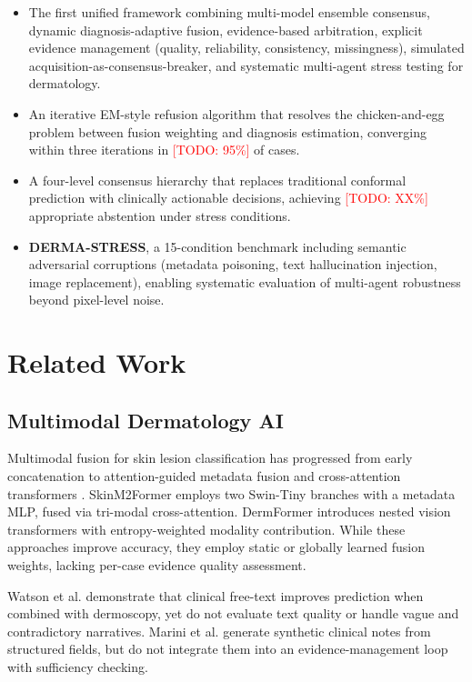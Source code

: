 \documentclass[conference]{IEEEtran}
\newcommand{\todo}[1]{\textcolor{red}{[TODO: #1]}}
\begin{document}
\begin{itemize}
    \item The first unified framework combining multi-model ensemble consensus, dynamic diagnosis-adaptive fusion, evidence-based arbitration, explicit evidence management (quality, reliability, consistency, missingness), simulated acquisition-as-consensus-breaker, and systematic multi-agent stress testing for dermatology.
    \item An iterative EM-style refusion algorithm that resolves the chicken-and-egg problem between fusion weighting and diagnosis estimation, converging within three iterations in \todo{95\%} of cases.
    \item A four-level consensus hierarchy that replaces traditional conformal prediction with clinically actionable decisions, achieving \todo{XX\%} appropriate abstention under stress conditions.
    \item \textbf{DERMA-STRESS}, a 15-condition benchmark including semantic adversarial corruptions (metadata poisoning, text hallucination injection, image replacement), enabling systematic evaluation of multi-agent robustness beyond pixel-level noise.
\end{itemize}

\section{Related Work}
\label{sec:related}

\subsection{Multimodal Dermatology AI}

Multimodal fusion for skin lesion classification has progressed from early concatenation \cite{pacheco2021} to attention-guided metadata fusion \cite{delima2022} and cross-attention transformers \cite{zhang2025}. SkinM2Former \cite{zhang2025} employs two Swin-Tiny branches with a metadata MLP, fused via tri-modal cross-attention. DermFormer \cite{cockayne2025} introduces nested vision transformers with entropy-weighted modality contribution. While these approaches improve accuracy, they employ static or globally learned fusion weights, lacking per-case evidence quality assessment.

Watson et al. \cite{watson2026} demonstrate that clinical free-text improves prediction when combined with dermoscopy, yet do not evaluate text quality or handle vague and contradictory narratives. Marini et al. \cite{marini2026} generate synthetic clinical notes from structured fields, but do not integrate them into an evidence-management loop with sufficiency checking.
\end{document}
